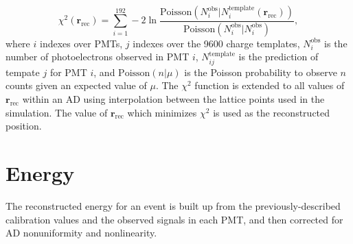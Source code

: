 \begin{equation}
    \chi^2(\textbf{r}_{\text{rec}}) = \sum_{i=1}^{192} -2\ln\frac{
        \text{Poisson}(N_i^{\text{obs}} \vert N_i^{\text{template}}(\textbf{r}_{\text{rec}}))
    }
    {
        \text{Poisson}(N_i^{\text{obs}} \vert N_i^{\text{obs}})
    },
\end{equation}
where $i$ indexes over PMTs, $j$ indexes over the \num{9600} charge templates,
$N_i^{\text{obs}}$ is the number of photoelectrons observed in PMT $i$,
$N_{ij}^{\text{template}}$ is the prediction of tempate $j$ for PMT $i$,
and $\text{Poisson}(n\vert\mu)$ is the Poisson probability
to observe $n$ counts given an expected value of $\mu$.
The $\chi^2$ function is extended to all values of $\textbf{r}_{\text{rec}}$
within an AD using interpolation between the lattice points used in the simulation.
The value of $\textbf{r}_{\text{rec}}$ which minimizes $\chi^2$
is used as the reconstructed position.

\section{Energy}
\label{sec:reco_energy}

The reconstructed energy for an event is built up from the previously-described
calibration values and the observed signals in each PMT,
and then corrected for AD nonuniformity and nonlinearity.

